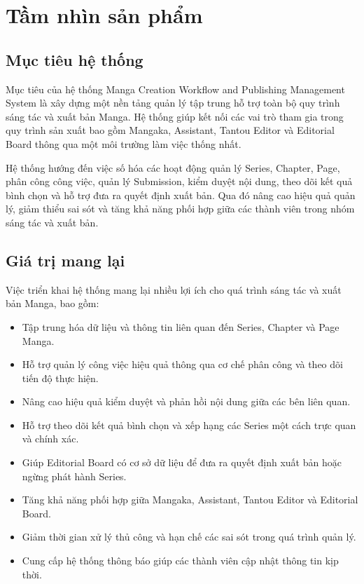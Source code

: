 \section{Tầm nhìn sản phẩm}
\label{sec:tam_nhin_san_pham}

\subsection{Mục tiêu hệ thống}
\label{subsec:muc_tieu_he_thong}

Mục tiêu của hệ thống Manga Creation Workflow and Publishing Management System là xây dựng một nền tảng quản lý tập trung hỗ trợ toàn bộ quy trình sáng tác và xuất bản Manga. Hệ thống giúp kết nối các vai trò tham gia trong quy trình sản xuất bao gồm Mangaka, Assistant, Tantou Editor và Editorial Board thông qua một môi trường làm việc thống nhất.

Hệ thống hướng đến việc số hóa các hoạt động quản lý Series, Chapter, Page, phân công công việc, quản lý Submission, kiểm duyệt nội dung, theo dõi kết quả bình chọn và hỗ trợ đưa ra quyết định xuất bản. Qua đó nâng cao hiệu quả quản lý, giảm thiểu sai sót và tăng khả năng phối hợp giữa các thành viên trong nhóm sáng tác và xuất bản.

\subsection{Giá trị mang lại}
\label{subsec:gia_tri_mang_lai}

Việc triển khai hệ thống mang lại nhiều lợi ích cho quá trình sáng tác và xuất bản Manga, bao gồm:
\begin{itemize}
    \item Tập trung hóa dữ liệu và thông tin liên quan đến Series, Chapter và Page Manga.
    \item Hỗ trợ quản lý công việc hiệu quả thông qua cơ chế phân công và theo dõi tiến độ thực hiện.
    \item Nâng cao hiệu quả kiểm duyệt và phản hồi nội dung giữa các bên liên quan.
    \item Hỗ trợ theo dõi kết quả bình chọn và xếp hạng các Series một cách trực quan và chính xác.
    \item Giúp Editorial Board có cơ sở dữ liệu để đưa ra quyết định xuất bản hoặc ngừng phát hành Series.
    \item Tăng khả năng phối hợp giữa Mangaka, Assistant, Tantou Editor và Editorial Board.
    \item Giảm thời gian xử lý thủ công và hạn chế các sai sót trong quá trình quản lý.
    \item Cung cấp hệ thống thông báo giúp các thành viên cập nhật thông tin kịp thời.
\end{itemize}


